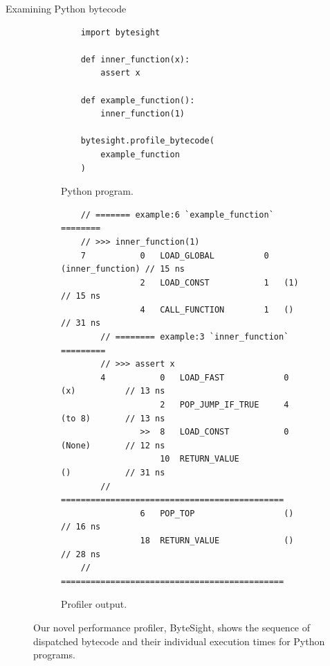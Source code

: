 \documentclass[10pt,aspectratio=169]{beamer}
\renewcommand{\footnotesize}{\fontsize{6pt}{6pt}\selectfont}
\begin{document}
\begin{frame}[fragile]{Examining Python bytecode}
    \begin{figure}[H]
        \centering
        \begin{subfigure}[b]{0.275\textwidth}
           \centering
            \begin{verbatim}
    import bytesight
    
    def inner_function(x):
        assert x
    
    def example_function():
        inner_function(1)
    
    bytesight.profile_bytecode(
        example_function
    )
            \end{verbatim}
            \footnotesize\vspace{2em}
            \caption{Python program.}
            \label{listing:profiler-example-python}
        \end{subfigure}
        \hfill
        \begin{subfigure}[b]{0.7\textwidth}
            \centering
            \begin{verbatim}
    // ======= example:6 `example_function` ========
    // >>> inner_function(1)
    7           0   LOAD_GLOBAL          0   (inner_function) // 15 ns
                2   LOAD_CONST           1   (1)              // 15 ns
                4   CALL_FUNCTION        1   ()               // 31 ns
        // ======== example:3 `inner_function` =========
        // >>> assert x
        4           0   LOAD_FAST            0   (x)          // 13 ns
                    2   POP_JUMP_IF_TRUE     4   (to 8)       // 13 ns
                >>  8   LOAD_CONST           0   (None)       // 12 ns
                    10  RETURN_VALUE             ()           // 31 ns
        // =============================================
                6   POP_TOP                  ()               // 16 ns
                18  RETURN_VALUE             ()               // 28 ns
    // =============================================
            \end{verbatim}
            \caption{Profiler output.}
            \label{listing:profiler-example-bytecode}
        \end{subfigure}
        \vspace{-0.5em}
        \captionsetup{name=Listing}
        \caption{Our novel performance profiler, ByteSight, shows the sequence of dispatched bytecode and their individual execution times for Python programs.}
        \label{listing:profiler-example}
    \end{figure}
\end{frame}
\end{document}
